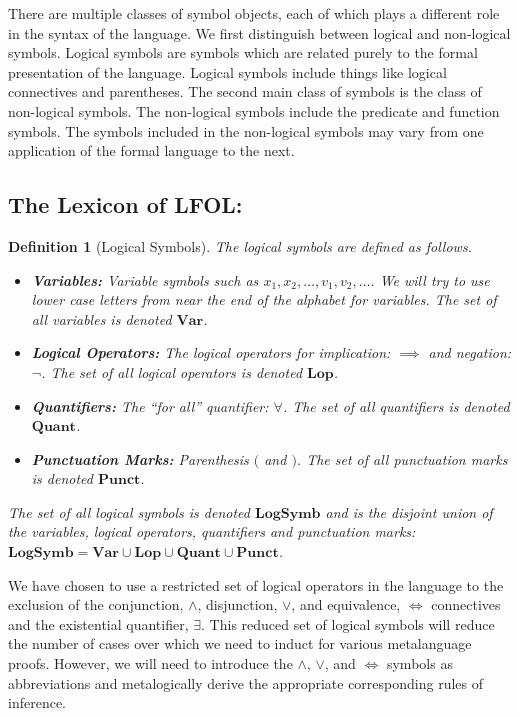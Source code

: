 \documentclass[12pt]{article}
\theoremstyle{break}
\newtheorem{definition}{Definition}[section]
\theoremstyle{break}
\theoremstyle{break}
\theoremstyle{break}
\theoremstyle{break}
\newtheorem{informal definition}[definition]{Informal Definition}
\newcommand{\qq}[1]{``#1''}
\begin{document}
There are multiple classes of symbol objects, each of which plays a different role in the syntax of the language.
We first distinguish between logical and non-logical symbols.
Logical symbols are symbols which are related purely to the formal presentation of the language.
Logical symbols include things like logical connectives and parentheses.
The second main class of symbols is the class of non-logical symbols.
The non-logical symbols include the predicate and function symbols.
The symbols included in the non-logical symbols may vary from one application of the formal language to the next.


\subsection{The Lexicon of LFOL:}

\begin{definition}[Logical Symbols]
The logical symbols are defined as follows.
\begin{itemize}
\item{\textbf{Variables:} Variable symbols such as $x_1, x_2, \ldots, v_1, v_2, \ldots$. We will try to use lower case letters from near the end of the alphabet for variables. The set of all variables is denoted $\textbf{Var}$.}
\item{\textbf{Logical Operators:} The logical operators for implication: $\implies$ and negation: $\lnot$. The set of all logical operators is denoted $\textbf{Lop}$.}
\item{\textbf{Quantifiers:} The \qq{for all} quantifier: $\forall$. The set of all quantifiers is denoted $\textbf{Quant}$.}
\item{\textbf{Punctuation Marks:} Parenthesis $($ and $)$. The set of all punctuation marks is denoted $\textbf{Punct}$.}
\end{itemize}

The set of all logical symbols is denoted $\textbf{LogSymb}$ and is the disjoint union of the variables, logical operators, quantifiers and punctuation marks: $\textbf{LogSymb} = \textbf{Var} \cup \textbf{Lop} \cup \textbf{Quant} \cup \textbf{Punct}$.
\end{definition}

We have chosen to use a restricted set of logical operators in the language to the exclusion of the conjunction, $\land$, disjunction, $\lor$, and equivalence, $\iff$ connectives and the existential quantifier, $\exists$.
This reduced set of logical symbols will reduce the number of cases over which we need to induct for various metalanguage proofs.
However, we will need to introduce the $\land$, $\lor$, and $\iff$ symbols as abbreviations and metalogically derive the appropriate corresponding rules of inference.
\end{document}

